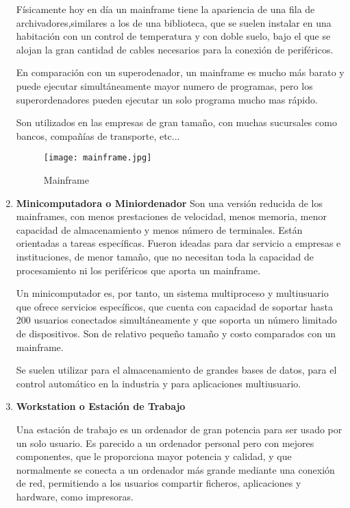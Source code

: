 \begin{enumerate}
    Físicamente hoy en día un mainframe tiene la apariencia de una fila de archivadores,similares a los de una biblioteca, que se suelen instalar en una habitación con un control de temperatura y con doble suelo, bajo el que se alojan la gran cantidad de cables necesarios para la conexión de periféricos.

    En comparación con un superodenador, un mainframe es mucho más barato y puede ejecutar simultáneamente mayor numero de programas, pero los superordenadores pueden ejecutar un solo programa mucho mas rápido.

    Son utilizados en las empresas de gran tamaño, con muchas sucursales como bancos, compañías de transporte, etc...

    \begin{figure}[ht]
        \centering
        \texttt{[image: mainframe.jpg]}
        \caption{Mainframe}
    \end{figure}

    \item \textbf{Minicomputadora o Miniordenador}
    Son una versión reducida de los mainframes, con menos prestaciones de velocidad, menos memoria, menor capacidad de almacenamiento y menos número de terminales. Están orientadas a tareas específicas. Fueron ideadas para dar servicio a empresas e instituciones, de menor tamaño, que no necesitan toda la capacidad de procesamiento ni los periféricos que aporta un mainframe.

    Un minicomputador es, por tanto, un sistema multiproceso y multiusuario que ofrece servicios específicos, que cuenta con capacidad de soportar hasta 200 usuarios conectados simultáneamente y que soporta un número limitado de dispositivos. Son de relativo pequeño tamaño y costo comparados con un mainframe.

    Se suelen utilizar para el almacenamiento de grandes bases de datos, para el control automático en la industria y para aplicaciones multiusuario.

    \vspace{5ex}

    \item \textbf{Workstation o Estación de Trabajo}

    Una estación de trabajo es un ordenador de gran potencia para ser usado por un solo usuario. Es parecido a un ordenador personal pero con mejores componentes, que le proporciona mayor potencia y calidad, y que normalmente se conecta a un ordenador más grande mediante una conexión de red, permitiendo a los usuarios compartir ficheros, aplicaciones y hardware, como impresoras.


\end{enumerate}
